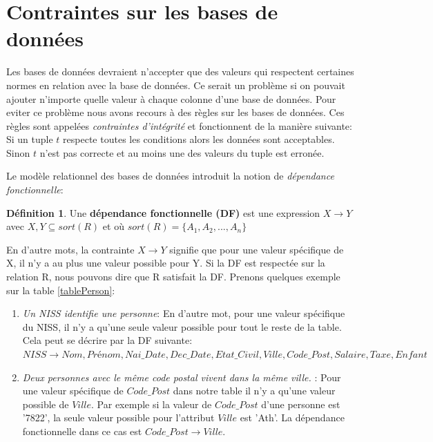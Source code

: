 \documentclass[letterpaper, 12pt]{report}
\theoremstyle{definition}
\newtheorem{mydef}{Définition}
\newcommand{\alinea}{
\hspace*{0.5cm}}
\begin{document}
\newpage

\section{Contraintes sur les bases de données}

\alinea Les bases de données devraient n'accepter que des valeurs qui respectent certaines normes en relation avec la base de données. Ce serait un problème si on pouvait ajouter n'importe quelle valeur à chaque colonne d'une base de données. Pour eviter ce problème nous avons recours à des règles sur les bases de données. Ces règles sont appelées \emph{contraintes d'intégrité} et fonctionnent de la manière suivante: Si un tuple $t$ respecte toutes les conditions alors les données sont acceptables. Sinon $t$ n'est pas correcte et au moins une des valeurs du tuple est erronée.

Le modèle relationnel des bases de données introduit la notion de \emph{dépendance fonctionnelle}:

\begin{mydef}
Une \textbf{dépendance fonctionnelle (DF)} est une expression $X \rightarrow Y$ avec $X,Y \subseteq
sort(R)$ et où $sort(R) = \{ A_1,A_2,...,A_n\}$
\end{mydef} 

En d'autre mots, la contrainte $X \rightarrow Y$ signifie que pour une valeur spécifique de X, il n'y a au plus une valeur possible pour Y. Si la DF est respectée sur la relation R, nous pouvons dire que R satisfait la DF. Prenons quelques exemple sur la table \ref{tablePerson}:

\begin{enumerate}
\item \emph{Un NISS identifie une personne}: En d'autre mot, pour une valeur spécifique du NISS, il n'y a qu'une seule valeur possible pour tout le reste de la table. Cela peut se décrire par la DF suivante:
$ NISS \rightarrow Nom, Prénom, Nai\_Date, Dec\_Date, Etat\_Civil, Ville, Code\_Post, Salaire, Taxe, Enfant$
\item \emph{Deux personnes avec le même code postal vivent dans la même ville.} : Pour une valeur spécifique de $Code\_Post$ dans notre table il n'y a qu'une valeur possible de $Ville$. Par exemple si la valeur de $Code\_Post$ d'une personne est '7822', la seule valeur possible pour l'attribut $Ville$ est 'Ath'. La dépendance fonctionnelle dans ce cas est $Code\_Post \rightarrow Ville$.
\end{enumerate}
\end{document}
